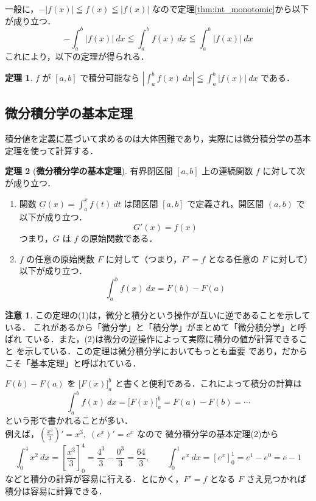 \documentclass[10pt, uplatex, dvipdfmx]{jsarticle}
\theoremstyle{definition}
\newtheorem{theorem}{定理}[section]
\newtheorem*{remark}{注意}
\numberwithin{equation}{section}
\newcommand{\ds}{\displaystyle}
\begin{document}
一般に，$- |f(x)| \leqq f(x) \leqq | f(x) |$ なので定理\ref{thm:int_monotomic}から以下が成り立つ．
\[
  -\int_{a}^{b} |f(x)| \ dx \leqq \int_{a}^{b} f(x) \ dx \leqq \int_{a}^{b} |f(x)| \ dx
\]
これにより，以下の定理が得られる．

\begin{theorem}\label{thm:int_absolute}
  $f$ が $[a,b]$ で積分可能なら $\ds \left| \int_{a}^{b} f(x) \ dx \right| \leqq \int_{a}^{b} |f(x)| \ dx$ である．
\end{theorem}

\subsection{微分積分学の基本定理}

積分値を定義に基づいて求めるのは大体困難であり，実際には微分積分学の基本定理を使って計算する．

\begin{theorem}[\textbf{微分積分学の基本定理}]\label{thm:fundamental}
  有界閉区間 $[a,b]$ 上の連続関数 $f$ に対して次が成り立つ．
  \begin{enumerate}[(1)]
  \item 関数 $\ds G(x) = \int_{a}^{x} f(t) \
    dt$ は閉区間 $[a,b]$ で定義され，開区間 $(a,b)$ で以下が成り立つ．
    \[
      G'(x)= f(x)
    \]
    つまり，$G$ は $f$ の原始関数である．
    
  \item $f$ の任意の原始関数 $F$ に対して（つまり，$F'=f$ となる任意の $F$ に対して）以下が成り立つ．
    \[
      \int_{a}^{b} f(x) \ dx = F(b) - F(a)
    \]
  \end{enumerate}
\end{theorem}

\begin{remark}
  この定理の(1)は，微分と積分という操作が互いに逆であることを示している．
  これがあるから「微分学」と「積分学」がまとめて「微分積分学」と呼ばれ
  ている．また，(2)は微分の逆操作によって実際に積分の値が計算できること
  を示している．この定理は微分積分学においてもっとも重要
  であり，だからこそ「基本定理」と呼ばれている．\\
\end{remark}

$F(b)-F(a)$ を $\Big[ F(x) \Big]_{a}^{b}$ と書くと便利である．これによって積分の計算は
\[
  \int_{a}^{b}f(x) \ dx = \Big[F(x)\Big]_{a}^{b} = F(a) - F(b) = \cdots 
\]
という形で書かれることが多い．\\

例えば，$\ds \left( \frac{x^3}{3} \right)' = x^3, \; \left( e^x \right)' = e^x$ なので
微分積分学の基本定理(2)から
\[
  \int_{0}^{4} x^2 \ dx = \left[ \frac{x^3}{3} \right]_{0}^{4} = \frac{4^3}{3} - \frac{0^3}{3} = \frac{64}{3}, \qquad
  \int_{0}^{1} e^x \ dx = \left[ e^x \right]_{0}^{1} = e^1 - e^0 = e-1
\]
などと積分の計算が容易に行える．とにかく，$F'=f$ となる $F$ さえ見つかれば積分は容易に計算できる．\\
\end{document}
